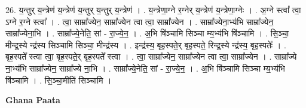 \documentclass[17pt]{extarticle}
\begin{document}
26. य॒न्तुर् य॒न्त्रेण॑ य॒न्त्रेण॑ य॒न्तुर् य॒न्तुर् य॒न्त्रेण॑ । . य॒न्त्रेणा॒ग्ने र॒ग्नेर् य॒न्त्रेण॑ य॒न्त्रेणा॒ग्नेः । . अ॒ग्ने स्त्वा᳚ त्वा॒ ऽग्ने र॒ग्ने स्त्वा᳚ । . त्वा॒ साम्रा᳚ज्येन॒ साम्रा᳚ज्येन त्वा त्वा॒ साम्रा᳚ज्येन । . साम्रा᳚ज्येना॒भ्य॑भि साम्रा᳚ज्येन॒ साम्रा᳚ज्येना॒भि । . साम्रा᳚ज्ये॒नेति॒ सां - रा॒ज्ये॒न॒ । . अ॒भि षि॑ञ्चामि सिञ्चा म्य॒भ्य॑भि षि॑ञ्चामि । . सि॒ञ्चा॒ मीन्द्र॒स्ये न्द्र॑स्य सिञ्चामि सिञ्चा॒ मीन्द्र॑स्य । . इन्द्र॑स्य॒ बृह॒स्पते॒र् बृह॒स्पते॒ रिन्द्र॒स्ये न्द्र॑स्य॒ बृह॒स्पतेः᳚ । . बृह॒स्पते᳚ स्त्वा त्वा॒ बृह॒स्पते॒र् बृह॒स्पते᳚ स्त्वा । . त्वा॒ साम्रा᳚ज्येन॒ साम्रा᳚ज्येन त्वा त्वा॒ साम्रा᳚ज्येन । . साम्रा᳚ज्ये ना॒भ्य॑भि साम्रा᳚ज्येन॒ साम्रा᳚ज्ये ना॒भि । . साम्रा᳚ज्ये॒नेति॒ सां - रा॒ज्ये॒न॒ । . अ॒भि षि॑ञ्चामि सिञ्चा म्य॒भ्य॑भि षि॑ञ्चामि । . सि॒ञ्चा॒मीति॑ सिञ्चामि । \newline

\textbf{Ghana Paata } \newline
\end{document}
